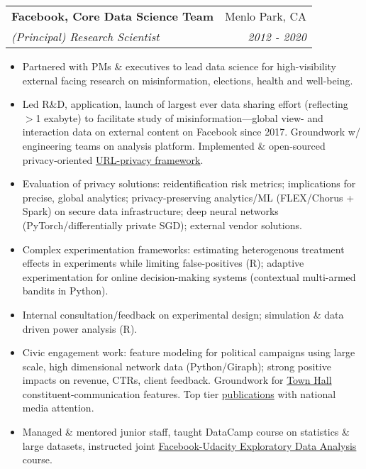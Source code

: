 \documentclass[letterpaper,11pt]{article}
\makeatletter
\newcommand{\resitem}[1]{\item #1 \vspace{-6pt}}
\newcommand{\ressubheading}[4]{\vspace{2pt}
\begin{tabular*}{7.58in}{l@{\extracolsep{\fill}}r}
		\textbf{#1} & #2 \\
		\textit{#3} & \textit{#4} \\
\end{tabular*}\vspace{-1pt}}
\makeatother
\begin{document}
\ressubheading{Facebook, Core Data Science Team}{Menlo Park, CA}{(Principal) Research Scientist}{2012 - 2020}
	\begin{itemize}
       	 	\resitem{Partnered with PMs \& executives to lead data science for high-visibility external facing research on misinformation, elections, health and well-being.} 
		\resitem{Led R\&D, application, launch of largest ever data sharing effort (reflecting $>$1 exabyte) to facilitate study of misinformation---global view- and interaction data on external content on Facebook since 2017. Groundwork w/ engineering teams on analysis platform. Implemented \& open-sourced privacy-oriented \href{https://github.com/facebookresearch/URL-Sanitization}{URL-privacy framework}.}
		\resitem{Evaluation of privacy solutions: reidentification risk metrics; implications for precise, global analytics; privacy-preserving analytics/ML (FLEX/Chorus + Spark) on secure data infrastructure; deep neural networks (PyTorch/differentially private SGD); external vendor solutions.}
		\resitem{Complex experimentation frameworks: estimating heterogenous treatment effects in experiments while limiting false-positives (R); adaptive experimentation for online decision-making systems (contextual multi-armed bandits in Python).}
		\resitem{Internal consultation/feedback on experimental design; simulation \& data driven power analysis (R).}
		\resitem{Civic engagement work: feature modeling for political campaigns using large scale, high dimensional network data (Python/Giraph); strong positive impacts on revenue, CTRs, client feedback. Groundwork for \href{https://www.facebook.com/townhall/}{Town Hall} constituent-communication features. Top tier \href{https://dl.dropboxusercontent.com/u/25710348/Science-2015-Bakshy-1130-2.pdf}{publications} with national media attention. }
		\resitem{Managed \& mentored junior staff, taught DataCamp course on statistics \& large datasets, instructed joint \href{https://www.udacity.com/course/data-analysis-with-r--ud651}{Facebook-Udacity Exploratory Data Analysis} course.}
	\end{itemize}
\end{document}
